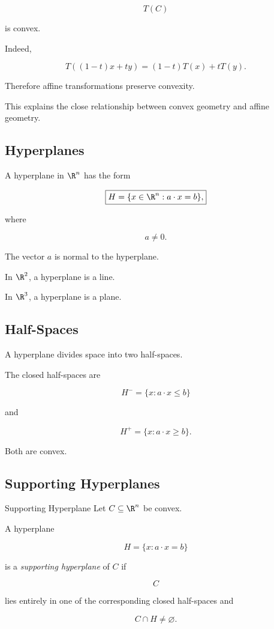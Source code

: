 \[
\boxed{
T(C)
}
\]

is convex.

Indeed,

\[
T((1-t)x+ty)
=
(1-t)T(x)+tT(y).
\]

Therefore affine transformations preserve convexity.

This explains the close relationship between convex geometry and affine
geometry.

\subsection{Hyperplanes}
\label{subsec:convex-hyperplanes}

A hyperplane in \(\R^n\) has the form

\[
\boxed{
H=
\{x\in\R^n:a\cdot x=b\},
}
\]

where

\[
a\neq0.
\]

The vector \(a\) is normal to the hyperplane.

In \(\R^2\), a hyperplane is a line.

In \(\R^3\), a hyperplane is a plane.

\subsection{Half-Spaces}
\label{subsec:convex-halfspaces}

A hyperplane divides space into two half-spaces.

The closed half-spaces are

\[
\boxed{
H^-=
\{x:a\cdot x\leq b\}
}
\]

and

\[
\boxed{
H^+=
\{x:a\cdot x\geq b\}.
}
\]

Both are convex.

\subsection{Supporting Hyperplanes}
\label{subsec:supporting-hyperplanes}

\begin{definitionbox}{Supporting Hyperplane}
Let \(C\subseteq\R^n\) be convex.

A hyperplane

\[
H=\{x:a\cdot x=b\}
\]

is a \emph{supporting hyperplane} of \(C\) if

\[
C
\]

lies entirely in one of the corresponding closed half-spaces and

\[
\boxed{
C\cap H\neq\varnothing.
}
\]
\end{definitionbox}

